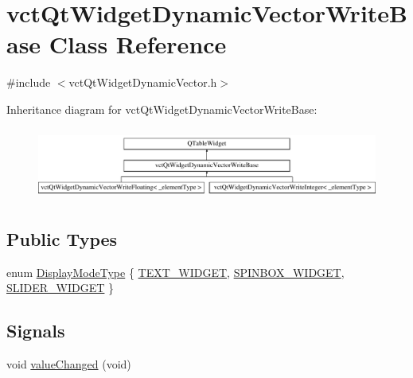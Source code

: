 \hypertarget{classvct_qt_widget_dynamic_vector_write_base}{}\section{vct\+Qt\+Widget\+Dynamic\+Vector\+Write\+Base Class Reference}
\label{classvct_qt_widget_dynamic_vector_write_base}


{\ttfamily \#include $<$vct\+Qt\+Widget\+Dynamic\+Vector.\+h$>$}

Inheritance diagram for vct\+Qt\+Widget\+Dynamic\+Vector\+Write\+Base\+:\begin{figure}[H]
\begin{center}
\leavevmode
\includegraphics[height=2.393162cm]{d5/d5d/classvct_qt_widget_dynamic_vector_write_base}
\end{center}
\end{figure}
\subsection*{Public Types}
\begin{DoxyCompactItemize}
\item 
enum \hyperlink{classvct_qt_widget_dynamic_vector_write_base_aefbf6a51f1009f060305c2b5e106cf02}{Display\+Mode\+Type} \{ \hyperlink{classvct_qt_widget_dynamic_vector_write_base_aefbf6a51f1009f060305c2b5e106cf02aa84e1bae39afe989e862b07258d0889e}{T\+E\+X\+T\+\_\+\+W\+I\+D\+G\+E\+T}, 
\hyperlink{classvct_qt_widget_dynamic_vector_write_base_aefbf6a51f1009f060305c2b5e106cf02ad22827225b00f1d8c44f7262d5a79d37}{S\+P\+I\+N\+B\+O\+X\+\_\+\+W\+I\+D\+G\+E\+T}, 
\hyperlink{classvct_qt_widget_dynamic_vector_write_base_aefbf6a51f1009f060305c2b5e106cf02ac4575729771466ec484101d1b87e7301}{S\+L\+I\+D\+E\+R\+\_\+\+W\+I\+D\+G\+E\+T}
 \}
\end{DoxyCompactItemize}
\subsection*{Signals}
\begin{DoxyCompactItemize}
\item 
void \hyperlink{classvct_qt_widget_dynamic_vector_write_base_abf2117ff3315c479e88f20ca1a1cf6da}{value\+Changed} (void)
\end{DoxyCompactItemize}
